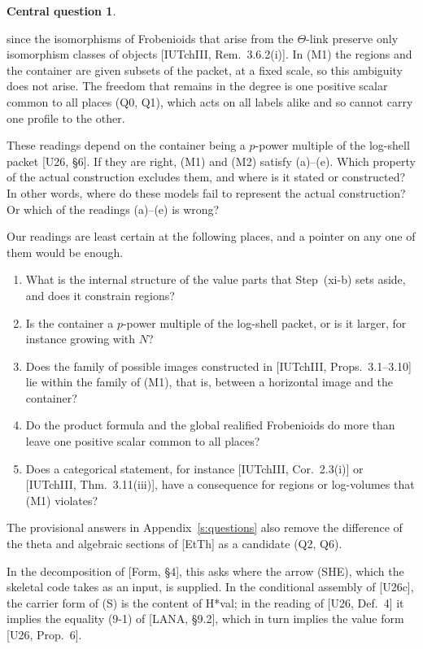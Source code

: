\documentclass[11pt]{article}
\theoremstyle{definition}
\newtheorem*{centralq}{Central question}
\begin{document}
\begin{centralq}
\begin{enumerate}[label=(\alph*),leftmargin=*]
since the isomorphisms of Frobenioids that arise from the
$\Theta$-link preserve only isomorphism classes of objects
[IUTchIII, Rem.~3.6.2(i)].  In (M1) the regions and the
container are given subsets of the packet, at a fixed scale, so
this ambiguity does not arise.  The freedom that remains in the
degree is one positive scalar common to all places (Q0, Q1), which
acts on all labels alike and so cannot carry one profile to the
other.
\end{enumerate}
These readings depend on the container being a $p$-power multiple of
the log-shell packet [U26, \S6].  If they are right, (M1) and (M2)
satisfy (a)--(e).  Which property of the actual construction
excludes them, and where is it stated or constructed?  In other
words, where do these models fail to represent the actual
construction?  Or which of the readings (a)--(e) is wrong?

Our readings are least certain at the following places, and a
pointer on any one of them would be enough.
\begin{enumerate}[label=(\roman*),leftmargin=*]
\item What is the internal structure of the value parts that
Step~(xi-b) sets aside, and does it constrain regions?
\item Is the container a $p$-power multiple of the log-shell packet,
or is it larger, for instance growing with $N$?
\item Does the family of possible images constructed in
[IUTchIII, Props.~3.1--3.10] lie within the family of (M1), that is,
between a horizontal image and the container?
\item Do the product formula and the global realified Frobenioids do
more than leave one positive scalar common to all places?
\item Does a categorical statement, for instance
[IUTchIII, Cor.~2.3(i)] or [IUTchIII, Thm.~3.11(iii)], have a
consequence for regions or log-volumes that (M1) violates?
\end{enumerate}
\end{centralq}

The provisional answers in Appendix~\ref{s:questions} also remove the
difference of the theta and algebraic sections of [EtTh] as a
candidate (Q2, Q6).

In the decomposition of [Form, \S4], this asks where the arrow
(SHE), which the skeletal code takes as an input, is supplied.  In
the conditional assembly of [U26c], the carrier form of (S) is the
content of H*val; in the reading of [U26, Def.~4] it implies the
equality (9-1) of [LANA, \S9.2], which in turn implies the value
form [U26, Prop.~6].
\end{document}

